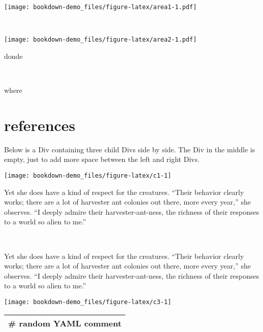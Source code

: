 \documentclass[
]{book}
\begin{document}
\begin{col}{0.45\textwidth}
\texttt{[image: bookdown-demo\_files/figure-latex/area1-1.pdf]}

\end{col}

\begin{col}{0.05\textwidth}
~

\end{col}

\begin{col}{0.45\textwidth}
\texttt{[image: bookdown-demo\_files/figure-latex/area2-1.pdf]}

\end{col}

\begin{col}{0.45\textwidth}
donde

\end{col}

\begin{col}{0.05\textwidth}
~

\end{col}

\begin{col}{0.45\textwidth}
where

\end{col}

\hypertarget{ref}{%
\chapter{references}\label{ref}}

Below is a Div containing three child Divs side by side. The Div
in the middle is empty, just to add more space between the left
and right Divs.

\begin{col}{0.45\textwidth}
\texttt{[image: bookdown-demo\_files/figure-latex/c1-1]}

Yet she does have a kind of respect for the creatures. ``Their behavior clearly works; there are a lot of harvester ant colonies out there, more every year,'' she observes. ``I deeply admire their harvester-ant-ness, the richness of their responses to a world so alien to me.''

\end{col}

\begin{col}{0.05\textwidth}
~

\end{col}

\begin{col}{0.45\textwidth}
Yet she does have a kind of respect for the creatures. ``Their behavior clearly works; there are a lot of harvester ant colonies out there, more every year,'' she observes. ``I deeply admire their harvester-ant-ness, the richness of their responses to a world so alien to me.''

\texttt{[image: bookdown-demo\_files/figure-latex/c3-1]}

\end{col}

\begin{longtable}[]{@{}l@{}}
\toprule
\endhead
\# random YAML comment \\
\bottomrule
\end{longtable}

  
\end{document}
